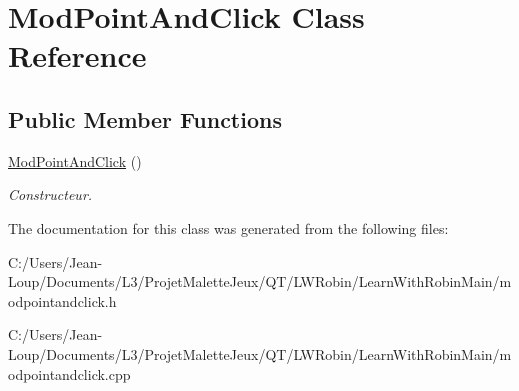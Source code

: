 \hypertarget{class_mod_point_and_click}{}\section{Mod\+Point\+And\+Click Class Reference}
\label{class_mod_point_and_click}
\subsection*{Public Member Functions}
\begin{DoxyCompactItemize}
\item 
\mbox{\label{class_mod_point_and_click_a4867dd40a30d08034b7df13d67076e10}} 
\hyperlink{class_mod_point_and_click_a4867dd40a30d08034b7df13d67076e10}{Mod\+Point\+And\+Click} ()
\begin{DoxyCompactList}\small\item\em Constructeur. \end{DoxyCompactList}\end{DoxyCompactItemize}


The documentation for this class was generated from the following files\+:\begin{DoxyCompactItemize}
\item 
C\+:/\+Users/\+Jean-\/\+Loup/\+Documents/\+L3/\+Projet\+Malette\+Jeux/\+Q\+T/\+L\+W\+Robin/\+Learn\+With\+Robin\+Main/modpointandclick.\+h\item 
C\+:/\+Users/\+Jean-\/\+Loup/\+Documents/\+L3/\+Projet\+Malette\+Jeux/\+Q\+T/\+L\+W\+Robin/\+Learn\+With\+Robin\+Main/modpointandclick.\+cpp\end{DoxyCompactItemize}
